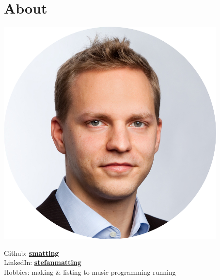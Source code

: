 \documentclass[]{deedy-resume-openfont}
\begin{document}
%
%
\lastupdated

%
%

%
%

\begin{minipage}[t]{0.33\textwidth} 



\section{About} 

\begin{center}
\includegraphics[scale=0.3]{mug-round.png}
\end{center}

Github: \href{https://github.com/smatting}{\bf smatting} \\
LinkedIn:  \href{https://www.linkedin.com/in/stefanmatting/}{\bf stefanmatting} \\
Hobbies: making \& listing to music \textbullet{} programming \textbullet{} running


\end{minipage}
\end{document}
